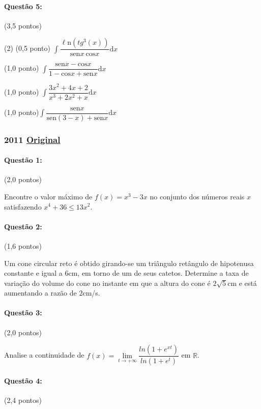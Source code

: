 \documentclass[12pt,a4paper]{article}
\newcommand{\Ln}{\ell\mathrm{n}}
\newcommand{\original}[1]{\tiny \href{#1}{Original} \normalsize}
\begin{document}
\paragraph{Questão 5:} (3,5 pontos)

\begin{tasks}(2)
\task (0,5 ponto) $\displaystyle\int \dfrac{\Ln(tg^3(x))}{\textrm{sen}x \ \textrm{cos}x} \textrm{d}x$

\task (1,0 ponto) $\displaystyle\int \dfrac{\textrm{sen}x-\textrm{cos}x}{1-\textrm{cos}x+\textrm{sen}x}\textrm{d}x$

\task (1,0 ponto) $\displaystyle\int \dfrac{3x^2+4x+2}{x^3+2x^2+x}\textrm{d}x$

\task (1,0 ponto)$\displaystyle\int \dfrac{\textrm{sen}x}{\textrm{sen}(3-x)+\textrm{sen}x}\textrm{d}x$
\end{tasks}
\newpage

\subsubsection{2011 \original{https://drive.google.com/open?id=1ABSgKAa8fr_VMYe_ccdfpNNCbyAkGjUW}}

\paragraph{Questão 1:} (2,0 pontos)

Encontre o valor máximo de $f(x)=x^3-3x$ no conjunto dos números reais $x$ satisfazendo $x^4+36 \leq 13x^2$.

\paragraph{Questão 2:} (1,6 pontos)

Um cone circular reto é obtido girando-se um triângulo retângulo de hipotenusa constante e igual a $6$cm, em torno de um de seus catetos. Determine a taxa de variação do volume do cone no instante em que a altura do cone é $2\sqrt{5}$cm e está aumentando a razão de $2$cm/s.

\paragraph{Questão 3:} (2,0 pontos)

Analise a continuidade de $f(x)=\lim\limits_{t\rightarrow+\infty} \dfrac{ln(1+e^{xt})}{ln(1+e^t)}$ em $\mathbb{R}$.

\paragraph{Questão 4:} (2,4 pontos)
\end{document}
